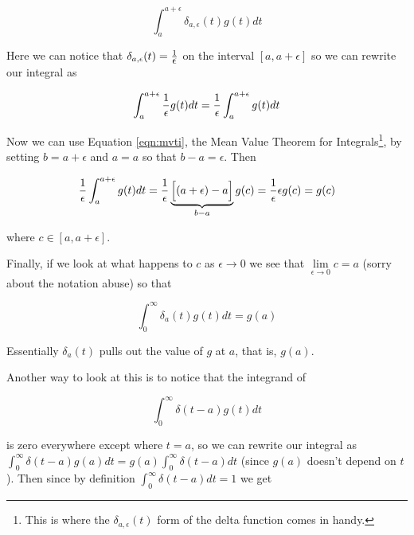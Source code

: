 \documentclass{article}
\theoremstyle{definition}
\begin{document}
\begin{equation*}
  \int_{a}^{a + \epsilon} \delta_{a,\epsilon}(t) g(t) dt
\end{equation*}

\bigskip
\noindent
Here we can notice that $ \delta_{a,\epsilon}(t) =
\frac{1}{\mathlarger{\epsilon}}$ on the interval $[a,
a+\epsilon]$ so we can rewrite our integral as

\bigskip
\begin{equation*}
  \int_{a}^{a + \epsilon} \frac{1}{\mathlarger{\epsilon}} g(t) dt
  =  \frac{1}{\mathlarger{\epsilon}} \int_{a}^{a + \epsilon} g(t) dt 
\end{equation*}

\bigskip
\noindent
Now we can use Equation \ref{eqn:mvti}, the Mean Value Theorem
for Integrals\footnote{This is where the $\delta_{a,\epsilon}(t)$
form of the delta function comes in handy.}, by setting $b = a +
\epsilon$ and $a = a$ so that $b - a = \epsilon$. Then

\bigskip
\begin{equation*}
 \frac{1}{\mathlarger{\epsilon}} \int_{a}^{a + \epsilon} g(t) dt
 =  \frac{1}{\mathlarger{\epsilon}} \underbrace{ \Big [(a +
 \epsilon) - a \Big]}_{b -a} g(c)
 =  \frac{1}{\mathlarger{\epsilon}} \epsilon g(c) = g(c) 
\end{equation*}

\bigskip
\noindent
where $c \in [a, a + \epsilon]$. 

\bigskip
\noindent
Finally, if we look at what happens to $c$ as $\epsilon \to 0$ we
see that $\lim\limits_{\epsilon \to 0} c = a$ (sorry about the
notation abuse) so that

\begin{equation}
  \int_{0}^{\infty} \delta_{a}(t) g(t) dt = g(a)
  \label{eqn:g(a)}
\end{equation}

\bigskip
\noindent
Essentially $\delta_{a}(t)$ pulls out the value of $g$ at $a$,
that is, $g(a)$.

\bigskip
\noindent
Another way to look at this \cite{youtube:suskind2008.4} is to
notice that the integrand of

\bigskip
\begin{equation*}
  \int_{0}^{\infty} \delta (t-a) g(t) dt
\end{equation*}

\bigskip
\noindent
is zero everywhere except where $t = a$, so we can rewrite our
integral as $\int_{0}^{\infty} \delta (t-a) g(a) dt = g(a)
\int_{0}^{\infty} \delta (t-a) dt$ (since $g(a)$ doesn't depend
on $t$).  Then since by definition $ \int_{0}^{\infty} \delta
(t-a) dt = 1$ we get
\end{document}
